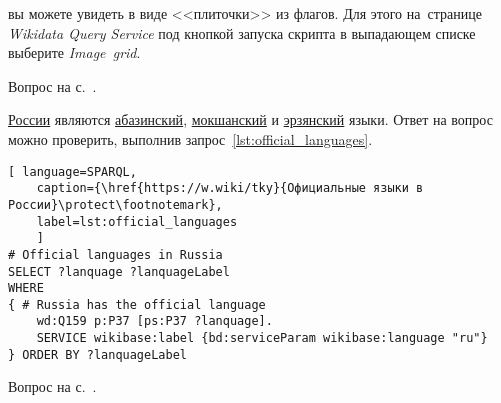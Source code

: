 \begin{task}
	
 вы можете увидеть в виде <<плиточки>> из флагов. 
Для этого на~странице \emph{Wikidata Query Service} под кнопкой запуска скрипта 
в выпадающем списке выберите  \emph{Image~grid}.
	
\small{\AnswerBackref Вопрос на с.~\pageref{lst:without_inception}.}
\end{task}



\begin{task}
\label{answer:official_language}
 \href{https://w.wiki/myt}{России} являются 
    \href{https://w.wiki/myv}{абазинский}, 
    \href{https://w.wiki/myx}{мокшанский} 
    и \href{https://w.wiki/myy}{эрзянский} языки. 
    Ответ на вопрос можно проверить, выполнив запрос~\ref{lst:official_languages}.
	
	\begin{lstlisting}[ language=SPARQL, 
	caption={\href{https://w.wiki/tky}{Официальные языки в России}\protect\footnotemark},
	label=lst:official_languages
	]
# Official languages in Russia
SELECT ?lanquage ?lanquageLabel
WHERE
{ # Russia has the official language
	wd:Q159 p:P37 [ps:P37 ?lanquage].
	SERVICE wikibase:label {bd:serviceParam wikibase:language "ru"}
} ORDER BY ?lanquageLabel
\end{lstlisting}
	
\small{\AnswerBackref Вопрос на с.~\pageref{lst:List_of_historical_countries}.}
\end{task}





\hfil{}\hfil%

